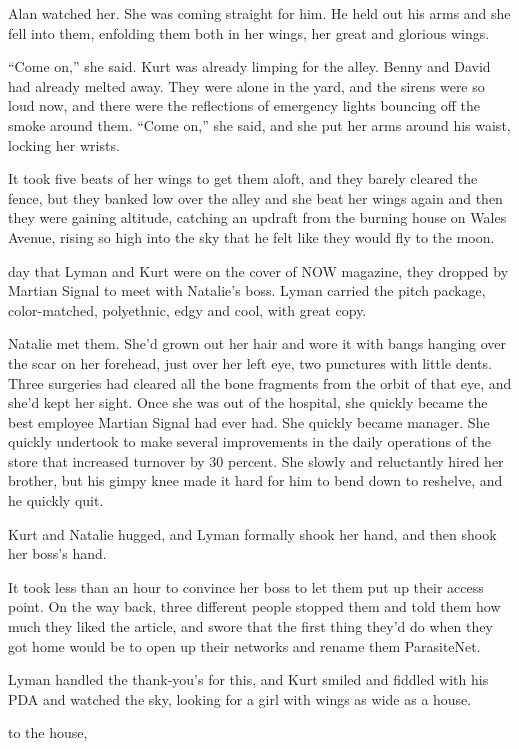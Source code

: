 Alan watched her.  She was coming straight for him.  He held out his
arms and she fell into them, enfolding them both in her wings, her
great and glorious wings.

``Come on,'' she said.  Kurt was already limping for the alley.  Benny
and David had already melted away.  They were alone in the yard, and
the sirens were so loud now, and there were the reflections of
emergency lights bouncing off the smoke around them.  ``Come on,'' she
said, and she put her arms around his waist, locking her wrists.

It took five beats of her wings to get them aloft, and they barely
cleared the fence, but they banked low over the alley and she beat her
wings again and then they were gaining altitude, catching an updraft
from the burning house on Wales Avenue, rising so high into the sky
that he felt like they would fly to the moon.

 day that Lyman and Kurt were on the cover of NOW magazine, they
dropped by Martian Signal to meet with Natalie's boss.  Lyman carried
the pitch package, color-matched, polyethnic, edgy and cool, with
great copy.

Natalie met them.  She'd grown out her hair and wore it with bangs
hanging over the scar on her forehead, just over her left eye, two
punctures with little dents.  Three surgeries had cleared all the bone
fragments from the orbit of that eye, and she'd kept her sight.  Once
she was out of the hospital, she quickly became the best employee
Martian Signal had ever had.  She quickly became manager.  She quickly
undertook to make several improvements in the daily operations of the
store that increased turnover by 30 percent.  She slowly and
reluctantly hired her brother, but his gimpy knee made it hard for him
to bend down to reshelve, and he quickly quit.

Kurt and Natalie hugged, and Lyman formally shook her hand, and then
shook her boss's hand.

It took less than an hour to convince her boss to let them put up
their access point.  On the way back, three different people stopped
them and told them how much they liked the article, and swore that the
first thing they'd do when they got home would be to open up their
networks and rename them ParasiteNet.

Lyman handled the thank-you's for this, and Kurt smiled and fiddled
with his PDA and watched the sky, looking for a girl with wings as
wide as a house.

 to the
house,


